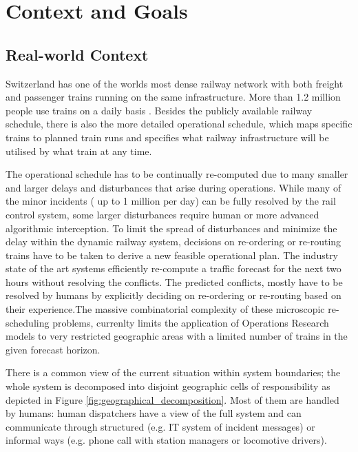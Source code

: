 \documentclass{article}
\begin{document}
\section{Context and Goals}

\subsection{Real-world Context}
Switzerland has one of the worlds most dense railway network with both freight and passenger trains running on the same infrastructure. More than 1.2 million people use trains on a daily basis \cite{rcsbrochure}.
Besides the publicly available railway schedule, there is also the more detailed operational schedule, which maps specific trains to planned train runs and specifies what railway infrastructure will be utilised by what train at any time.

The operational schedule has to be continually re-computed due to many smaller and larger delays and disturbances that arise during operations. While many of the minor incidents ( up to 1 million per day) can be fully resolved by the rail control system, some larger disturbances require human or more advanced algorithmic interception. To limit the spread of disturbances and minimize the delay within the dynamic railway system, decisions on re-ordering or re-routing trains have to be taken to derive a new feasible operational plan. The industry state of the art systems efficiently re-compute a traffic forecast for the next two hours without resolving the conflicts. The predicted conflicts, mostly have to be resolved by humans by explicitly deciding on re-ordering or re-routing based on their experience.The massive combinatorial complexity of these microscopic re-scheduling problems, currenlty limits the application of Operations Research models to very restricted geographic areas with a limited number of trains in the given forecast horizon.

There is a common view of the current situation within system boundaries; the whole system is decomposed into disjoint geographic cells of responsibility as depicted in Figure \ref{fig:geographical_decomposition}. Most of them are handled by humans: human dispatchers have a view of the full system and can communicate through structured (e.g. IT system of incident messages) or informal ways (e.g. phone call with station managers or locomotive drivers).
\end{document}
